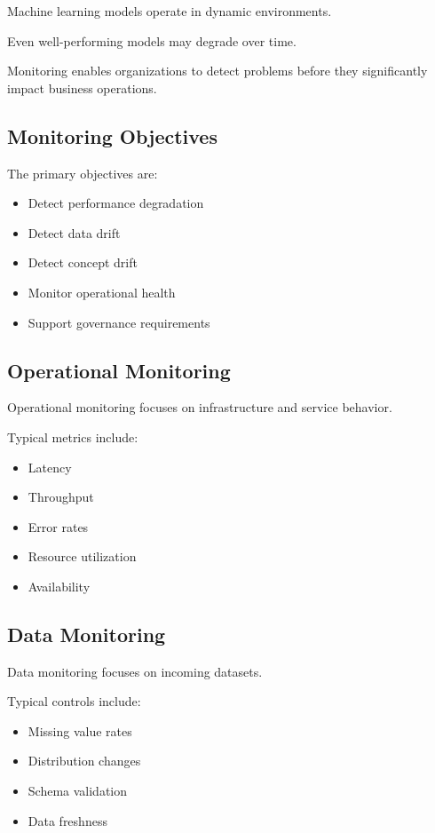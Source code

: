 Machine learning models operate in dynamic environments.

Even well-performing models may degrade over time.

Monitoring enables organizations to detect problems before they significantly impact business operations.

\subsection{Monitoring Objectives}

The primary objectives are:

\begin{itemize}
    \item Detect performance degradation
    \item Detect data drift
    \item Detect concept drift
    \item Monitor operational health
    \item Support governance requirements
\end{itemize}

\subsection{Operational Monitoring}

Operational monitoring focuses on infrastructure and service behavior.

Typical metrics include:

\begin{itemize}
    \item Latency
    \item Throughput
    \item Error rates
    \item Resource utilization
    \item Availability
\end{itemize}

\subsection{Data Monitoring}

Data monitoring focuses on incoming datasets.

Typical controls include:

\begin{itemize}
    \item Missing value rates
    \item Distribution changes
    \item Schema validation
    \item Data freshness
\end{itemize}

